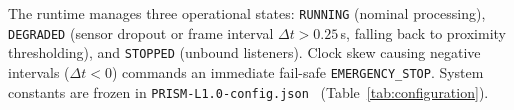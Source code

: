 

The runtime manages three operational states: \texttt{RUNNING} (nominal processing), \texttt{DEGRADED} (sensor dropout or frame interval $\Delta t > 0.25$\,s, falling back to proximity thresholding), and \texttt{STOPPED} (unbound listeners). Clock skew causing negative intervals ($\Delta t < 0$) commands an immediate fail-safe \texttt{EMERGENCY\_STOP}. System constants are frozen in \texttt{PRISM-L1.0-config.json}~\cite{PRISM-L1.0-config,PRISM-L1.0-README} (Table~\ref{tab:configuration}).
